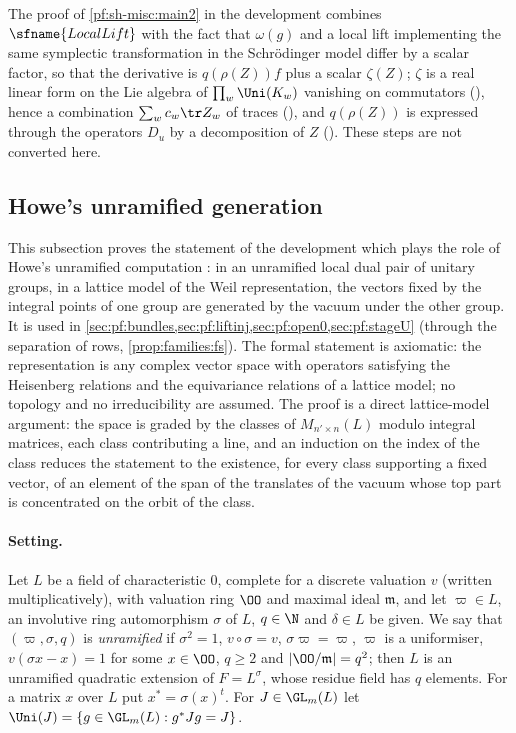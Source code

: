 \begin{remark}\label{pf:sh-misc:lie2rem}
The proof of \cref{pf:sh-misc:main2} in the development combines $\sfname{LocalLift}$ with the fact that $\omega(g)$ and a local lift implementing
the same symplectic transformation in the Schr\"odinger model differ by a scalar factor, so that the derivative is $q(\rho(Z))f$ plus a
scalar $\zeta(Z)$; $\zeta$ is a real linear form on the Lie algebra of $\prod_w\Uni(K_w)$ vanishing on commutators
(), hence a combination $\sum_wc_w\tr Z_w$ of traces
(), and $q(\rho(Z))$ is expressed through the operators $D_u$ by a decomposition of
$Z$ (). These steps are not converted here.
\end{remark}

\subsection{Howe's unramified generation}\label{sec:pf:sh-misc:howe}

This subsection proves the statement of the development which plays the role of Howe's unramified computation
\cite{Howe1979}: in an unramified local dual pair of unitary groups, in a lattice model of the Weil representation, the
vectors fixed by the integral points of one group are generated by the vacuum under the other group. It is used in
\cref{sec:pf:bundles,sec:pf:liftinj,sec:pf:open0,sec:pf:stageU} (through the separation of rows, \cref{prop:families:fs}).
The formal statement is axiomatic: the representation is any complex vector space with operators satisfying the Heisenberg
relations and the equivariance relations of a lattice model; no topology and no irreducibility are assumed. The proof is a
direct lattice-model argument: the space is graded by the classes of $M_{n'\times n}(L)$ modulo integral matrices, each class
contributing a line, and an induction on the index of the class reduces the statement to the existence, for every class
supporting a fixed vector, of an element of the span of the translates of the vacuum whose top part is concentrated on the
orbit of the class.


\paragraph{Setting.}
Let $L$ be a field of characteristic $0$, complete for a discrete valuation $v$ (written multiplicatively), with valuation ring
$\OO$ and maximal ideal $\mathfrak m$, and let $\varpi\in L$, an involutive ring automorphism $\sigma$ of $L$, $q\in\N$ and $\delta\in L$ be
given. We say that $(\varpi,\sigma,q)$ is \emph{unramified} if $\sigma^2=1$, $v\circ\sigma=v$, $\sigma\varpi=\varpi$, $\varpi$ is a uniformiser, $v(\sigma
x-x)=1$ for some $x\in\OO$, $q\ge2$ and $|\OO/\mathfrak m|=q^2$; then $L$ is an unramified quadratic extension of $F=L^\sigma$, whose
residue field has $q$ elements. For a matrix $x$ over $L$ put $x^*=\sigma(x)^t$. For $J\in\GL_m(L)$ let $\Uni(J)=\{g\in\GL_m(L):g^*Jg=J\}$.

